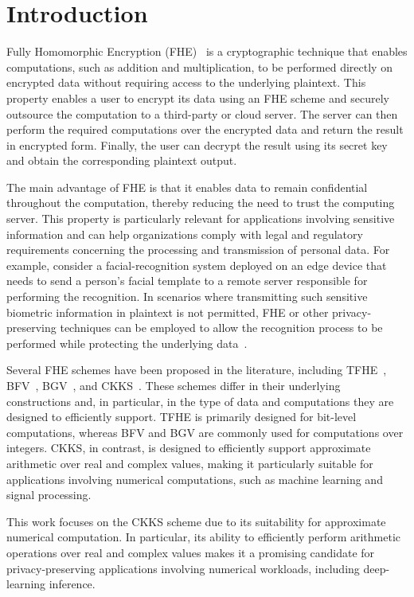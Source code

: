 \chapter{Introduction} \label{cap:introducao}

Fully Homomorphic Encryption (FHE)~\cite{martins2017survey} is a cryptographic technique that enables computations, such as addition and multiplication, to be performed directly on encrypted data without requiring access to the underlying plaintext. This property enables a user to encrypt its data using an FHE scheme and securely outsource the computation to a third-party or cloud server. The server can then perform the required computations over the encrypted data and return the result in encrypted form. Finally, the user can decrypt the result using its secret key and obtain the corresponding plaintext output.

The main advantage of FHE is that it enables data to remain confidential throughout the computation, thereby reducing the need to trust the computing server. This property is particularly relevant for applications involving sensitive information and can help organizations comply with legal and regulatory requirements concerning the processing and transmission of personal data. For example, consider a facial-recognition system deployed on an edge device that needs to send a person's facial template to a remote server responsible for performing the recognition. In scenarios where transmitting such sensitive biometric information in plaintext is not permitted, FHE or other privacy-preserving techniques can be employed to allow the recognition process to be performed while protecting the underlying data~\cite{martin2025hydia}.

Several FHE schemes have been proposed in the literature, including TFHE~\cite{chillotti2020tfhe}, BFV~\cite{fan2012somewhat}, BGV~\cite{brakerski2014leveled}, and CKKS~\cite{cheon2017homomorphic}. These schemes differ in their underlying constructions and, in particular, in the type of data and computations they are designed to efficiently support. TFHE is primarily designed for bit-level computations, whereas BFV and BGV are commonly used for computations over integers. CKKS, in contrast, is designed to efficiently support approximate arithmetic over real and complex values, making it particularly suitable for applications involving numerical computations, such as machine learning and signal processing.

This work focuses on the CKKS scheme due to its suitability for approximate numerical computation. In particular, its ability to efficiently perform arithmetic operations over real and complex values makes it a promising candidate for privacy-preserving applications involving numerical workloads, including deep-learning inference.

